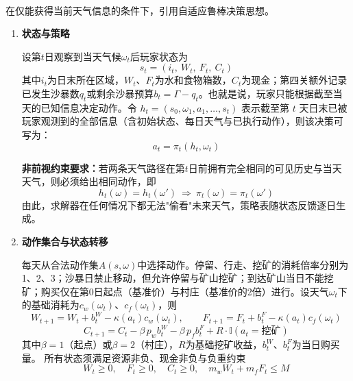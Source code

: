 \documentclass{cumcmthesis}
\numberwithin{equation}{section}
\numberwithin{figure}{section}
\numberwithin{table}{section}
\begin{document}
在仅能获得当前天气信息的条件下，引用自适应鲁棒决策思想\textsuperscript{\cite{hujianpeng2022}}。
\begin{enumerate}
    \item  \textbf{状态与策略}
    
    \hspace*{2em}设第$t$日观察到当天气候$\omega_t$后玩家状态为
\vspace{-10pt}
    \begin{equation}
s_t=(i_t,\ W_t,\ F_t,\ C_t)
\label{eq:q2_state}
\end{equation}
其中$i_t$为日末所在区域，$W_t$、$F_t$为水和食物箱数，$C_t$为现金；第四关额外记录已发生沙暴数$q_t$或剩余沙暴预算$b_t=\Gamma-q_t$。也就是说，玩家只能根据截至当天的已知信息决定动作。令 $h_t=(s_0,\omega_1,a_1,\dots,s_t)$ 表示截至第 $t$ 天日末已被玩家观测到的全部信息（含初始状态、每日天气与已执行动作），则该决策可写为：
\vspace{-10pt}
\begin{equation}
a_t=\pi_t(h_t,\omega_t)
\label{eq:q2_policy}
\end{equation}

\hspace*{2em}\textbf{非前视约束要求：}若两条天气路径在第$t$日前拥有完全相同的可见历史与当天天气，则必须给出相同动作，即
\vspace{-10pt}
\begin{equation}
h_t(\omega)=h_t(\omega')\ \Rightarrow\ \pi_t(\omega)=\pi_t(\omega')
\label{eq:q2_nonanticip}
\end{equation}
由此，求解器在任何情况下都无法"偷看"未来天气，策略表随状态反馈逐日生成。

    \item  \textbf{动作集合与状态转移}
    
    \hspace*{2em}每天从合法动作集$A(s,\omega)$中选择动作。停留、行走、挖矿的消耗倍率分别为1、2、3；沙暴日禁止移动，但允许停留与矿山挖矿；到达矿山当日不能挖矿；购买仅在第0日起点（基准价）与村庄（基准价的2倍）进行。设天气$\omega_t$下的基础消耗为$c_w(\omega_t)$、$c_f(\omega_t)$，则
\vspace{-10pt}
    \begin{equation}
W_{t+1}=W_t+b^W_t-\kappa(a_t)c_w(\omega_t),\qquad
F_{t+1}=F_t+b^F_t-\kappa(a_t)c_f(\omega_t)
\label{eq:q2_resource}
\end{equation}
\vspace{-10pt}
\begin{equation}
C_{t+1}=C_t-\beta\,p_w b^W_t-\beta\,p_f b^F_t+R\cdot\mathbb{I}(a_t=\text{挖矿})
\label{eq:q2_cash}
\end{equation}
其中$\beta=1$（起点）或$\beta=2$（村庄），$R$为基础挖矿收益，$b^W_t$、$b^F_t$为当日购买量。
\hspace*{2em}所有状态须满足资源非负、现金非负与负重约束
\vspace{-8pt}
\begin{equation}
W_t\ge 0,\quad F_t\ge 0,\quad C_t\ge 0,\quad m_w W_t+m_f F_t\le M
\label{eq:q2_con}
\end{equation}


\end{enumerate}
\end{document}
